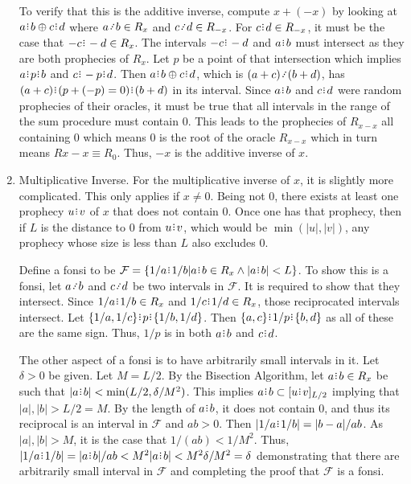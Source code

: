 \documentclass[12pt]{article}
\begin{document}
\begin{enumerate}
    To verify that this is the additive inverse, compute $x + (-x)$ by looking at $a\rint b \oplus c\rint d$ where $a \lte b \in R_x$ and $c \lte d \in R_{-x}$. For $c\rint d \in R_{-x}$, it must be the case that $-c\rint -d \in R_x$. The intervals $-c \rint  -d$ and $a\rint b$ must intersect as they are both prophecies of $R_x$. Let $p$ be a point of that intersection which implies $a\rint p\rint b$ and $c\rint -p\rint d$. Then $a\rint b \oplus c\rint d$, which is $(a+c) \lte (b+d)$, has $(a+c) \rint  ( p + (-p) =0 ) \rint  (b+d)$ in its interval. Since $a\rint b$ and $c\rint d$ were random prophecies of their oracles, it must be true that all intervals in the range of the sum procedure must contain 0. This leads to the prophecies of $R_{x-x}$ all containing 0 which means 0 is the root of the oracle $R_{x-x}$ which in turn means $R{x-x} \equiv R_0$.  Thus, $-x$ is the additive inverse of $x$. 
    
    \item Multiplicative Inverse. For the multiplicative inverse of $x$, it is slightly more complicated. This only applies if $x \neq 0$. Being not 0, there exists at least one prophecy $u\rint v$ of $x$ that does not contain 0. Once one has that prophecy, then if $L$ is the distance to 0 from $u\rint v$, which would be $\min(|u|, |v|)$, any prophecy whose size is less than $L$ also excludes 0. 
    
    Define a fonsi to be $\mathcal{F} = \{1/a \rint  1/b | a\rint b \in R_x \wedge |a\rint b| < L \}$. To show this is a fonsi, let $a\lte b$ and $c \lte d$ be two intervals in $\mathcal{F}$. It is required to show that they intersect. Since $1/a\rint 1/b \in R_x$ and $1/c\rint 1/d \in R_x$, those reciprocated intervals intersect. Let $\{1/a, 1/c\} \rint  p \rint  \{1/b, 1/d\}$. Then $\{a, c\} \rint  1/p \rint  \{b, d\}$ as all of these are the same sign. Thus, $1/p$ is in both $a\rint b$ and $c\rint d$. 

    The other aspect of a fonsi is to have arbitrarily small intervals in it. Let $\delta > 0$ be given. Let $M = L/2$. By the Bisection Algorithm, let $a\rint b \in R_x$ be such that $|a\rint b| < \min(L/2, \delta/M^2)$. This implies $a\rint b \subset \halo[L/2]{u\rint v}$ implying that $|a|, |b| >  L/2 = M$. By the length of $a\rint b$, it does not contain 0, and thus its reciprocal is an interval in $\mathcal{F}$ and $ab > 0$. Then $|1/a\rint  1/b| = |b-a|/ab$. As $|a|, |b| > M$, it is the case that $1/(ab) < 1/M^2$. Thus, $|1/a\rint 1/b| = |a\rint b|/ab < M^2|a\rint b| < M^2 \delta/M^2 = \delta$ demonstrating that there are arbitrarily small interval in $\mathcal{F}$ and completing the proof that $\mathcal{F}$ is a fonsi. 
    

\end{enumerate}
\end{document}
